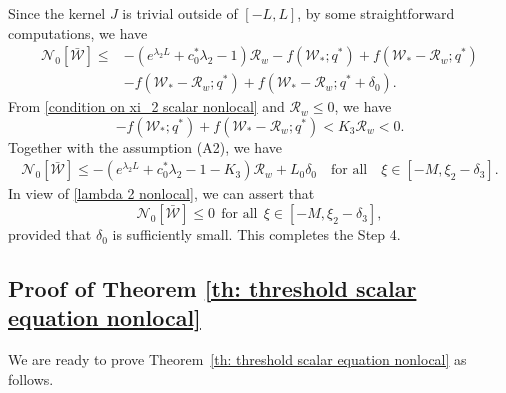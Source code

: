 \documentclass[11pt,a4paper]{article}
\numberwithin{equation}{section}
\numberwithin{figure}{section}
\newcommand\beaa{\begin{eqnarray*}}
\newcommand\eeaa{\end{eqnarray*}}
\begin{document}
Since the kernel $J$ is trivial outside of $[-L,L]$, by some straightforward computations, we have
\begin{equation*}
\begin{aligned}
\mathcal{N}_0[\bar{\mathcal W}]
\le&-(e^{\lambda_2L}+c_0^*\lambda_2-1)\mathcal{R}_w-f(\mathcal{W}_*;q^*)+f(\mathcal{W}_*-\mathcal{R}_w;q^*)\\
&-f(\mathcal{W}_*-\mathcal{R}_w;q^*)+f(\mathcal{W}_*-\mathcal{R}_w;q^*+\delta_0).
\end{aligned}
\end{equation*}
From \eqref{condition on xi_2 scalar nonlocal} and $\mathcal{R}_w\le 0$, we have 
$$-f(\mathcal{W}_*;q^*)+f(\mathcal{W}_*-\mathcal{R}_w;q^*)< K_3\mathcal{R}_w<0.$$
Together with the assumption (A2), we have
\beaa
\mathcal{N}_0[\bar{\mathcal W}]\leq -(e^{\lambda_2L}+c_0^*\lambda_2-1-K_3)\mathcal{R}_w+L_0\delta_0\quad\text{for all}\quad \xi\in[-M,\xi_2-\delta_3].
\eeaa
In view of \eqref{lambda 2 nonlocal},
we can assert that 
$$\mathcal{N}_0[\bar{\mathcal W}]\le 0\ \ \text{for all}\ \ \xi\in[-M,\xi_2-\delta_3],$$
provided that $\delta_0$ is sufficiently small.
This completes the Step 4.

\subsection{Proof of Theorem \ref{th: threshold scalar equation nonlocal}}

\noindent

We are ready to prove Theorem~\ref{th: threshold scalar equation nonlocal} as follows.
\end{document}
